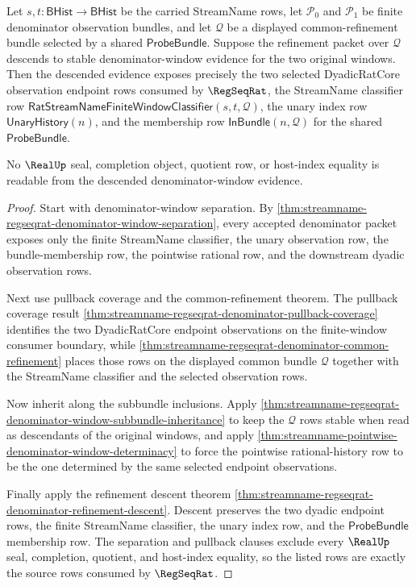 \begin{theorem}
\label{thm:regseqrat-denominator-window-dyadic-source-exactness}
Let $s,t:\mathsf{BHist}\to\mathsf{BHist}$ be the carried StreamName rows, let
$\mathcal P_0$ and $\mathcal P_1$ be finite denominator observation bundles,
and let $\mathcal Q$ be a displayed common-refinement bundle selected by a
shared $\mathsf{ProbeBundle}$. Suppose the refinement packet over
$\mathcal Q$ descends to stable denominator-window evidence for the two
original windows. Then the descended evidence exposes precisely the two
selected DyadicRatCore observation endpoint rows consumed by $\RegSeqRat$,
the StreamName classifier row
$\mathsf{RatStreamNameFiniteWindowClassifier}(s,t,\mathcal Q)$, the unary
index row $\mathsf{UnaryHistory}(n)$, and the membership row
$\mathsf{InBundle}(n,\mathcal Q)$ for the shared $\mathsf{ProbeBundle}$.

No $\RealUp$ seal, completion object, quotient row, or host-index equality is
readable from the descended denominator-window evidence.
\end{theorem}
\begin{proof}
Start with denominator-window separation. By
\autoref{thm:streamname-regseqrat-denominator-window-separation}, every
accepted denominator packet exposes only the finite StreamName classifier, the
unary observation row, the bundle-membership row, the pointwise rational row,
and the downstream dyadic observation rows.

Next use pullback coverage and the common-refinement theorem. The pullback
coverage result
\autoref{thm:streamname-regseqrat-denominator-pullback-coverage} identifies
the two DyadicRatCore endpoint observations on the finite-window consumer
boundary, while
\autoref{thm:streamname-regseqrat-denominator-common-refinement} places those
rows on the displayed common bundle $\mathcal Q$ together with the StreamName
classifier and the selected observation rows.

Now inherit along the subbundle inclusions. Apply
\autoref{thm:streamname-regseqrat-denominator-window-subbundle-inheritance} to
keep the $\mathcal Q$ rows stable when read as descendants of the original
windows, and apply
\autoref{thm:streamname-pointwise-denominator-window-determinacy} to force the
pointwise rational-history row to be the one determined by the same selected
endpoint observations.

Finally apply the refinement descent theorem
\autoref{thm:streamname-regseqrat-denominator-refinement-descent}. Descent
preserves the two dyadic endpoint rows, the finite StreamName classifier, the
unary index row, and the $\mathsf{ProbeBundle}$ membership row. The separation
and pullback clauses exclude every $\RealUp$ seal, completion, quotient, and
host-index equality, so the listed rows are exactly the source rows consumed
by $\RegSeqRat$.
\end{proof}
